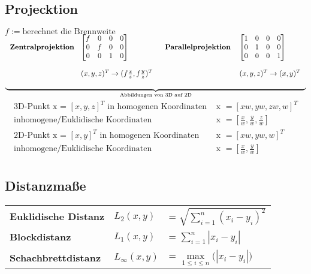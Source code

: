 \documentclass[8pt]{article}
\begin{document}
			\subsection{Projecktion}
				$f := \text{berechnet die Brennweite}$\\
				$\underbrace{\begin{tabular}{p{3cm} p{3.5cm} p{3.3cm} p{3cm}}
					\textbf{Zentralprojektion } & $
						\begin{bmatrix}
							f & 0 & 0 & 0 \\
							0 & f & 0 & 0 \\
							0 & 0 & 1 & 0 \\
						\end{bmatrix}$ & 
					\textbf{ Parallelprojektion } & {$
						\begin{bmatrix}
							1 & 0 & 0 & 0 \\
							0 & 1 & 0 & 0 \\
							0 & 0 & 0 & 1 \\
						\end{bmatrix}
					$}\\\\
					& $(x, y, z)^T \rightarrow (f \frac{x}{z}, f \frac{y}{z})^T$ & & $(x, y, z)^T \rightarrow (x, y)^T$\\\\
				\end{tabular}}_{\text{Abbildungen von 3D auf 2D}}$\\
				\begin{align*}
					\text{3D-Punkt x = } [x, y, z]^T \text{ in homogenen Koordinaten } & \text{x } = [xw, yw, zw, w]^T\\
					\text{inhomogene/Euklidische Koordinaten } & \text{x } = [\frac{x}{w}, \frac{y}{w}, \frac{z}{w}]\\
					\text{2D-Punkt x = } [x, y]^T \text{ in homogenen Koordinaten } & \text{x } = [xw, yw, w]^T\\
					\text{inhomogene/Euklidische Koordinaten } & \text{x } = [\frac{x}{w}, \frac{y}{w}]\\
				\end{align*}
			\subsection{Distanzma\ss e}
				\begin{tabular}{p{3.5cm} p{1.5cm} p{3cm}}
					\textbf{Euklidische Distanz } 	& $L_2(x, y)$ 		& = $\sqrt{\sum\limits_{i = 1}^{n} (x_i - y_i)^2}$\\
					\textbf{Blockdistanz } 			& $L_1(x, y)$ 		& = $\sum\limits_{i = 1}^{n} |x_i - y_i|$ \\
					\textbf{Schachbrettdistanz } 	& $L_\infty(x, y)$ 	& = $\max\limits^{}_{1 \leq i \leq n} \big( |x_i - y_i|\big)$ \\
				\end{tabular}
\end{document}

